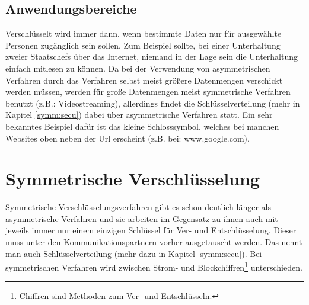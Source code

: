 \documentclass[a4paper,12pt,titlepage]{article}
\begin{document}
\subsection{Anwendungsbereiche}
Verschlüsselt wird immer dann, wenn bestimmte Daten nur für ausgewählte Personen zugänglich sein sollen. Zum Beispiel sollte, bei einer Unterhaltung zweier Staatschefs über das Internet, niemand in der Lage sein die Unterhaltung einfach mitlesen zu können. Da bei der Verwendung von asymmetrischen Verfahren durch das Verfahren selbst meist größere Datenmengen verschickt werden müssen, werden für große Datenmengen meist symmetrische Verfahren benutzt (z.B.: Videostreaming), allerdings findet die Schlüsselverteilung (mehr in Kapitel \ref{symm:secu}) dabei über asymmetrische Verfahren statt. Ein sehr bekanntes Beispiel dafür ist das kleine Schlosssymbol, welches bei manchen Websites oben neben der Url erscheint (z.B. bei: www.google.com).
\newpage

\section{Symmetrische Verschlüsselung}\label{symm}
Symmetrische Verschlüsselungsverfahren gibt es schon deutlich länger als asymmetrische Verfahren und sie arbeiten im Gegensatz zu ihnen auch mit jeweils immer nur einem einzigen Schlüssel für Ver- und Entschlüsselung. Dieser muss unter den Kommunikationspartnern vorher ausgetauscht werden. Das nennt man auch Schlüsselverteilung (mehr dazu in Kapitel \ref{symm:secu}). \newline Bei symmetrischen Verfahren wird zwischen Strom- und Blockchiffren\footnote{Chiffren sind Methoden zum Ver- und Entschlüsseln.} unterschieden. %
\end{document}
